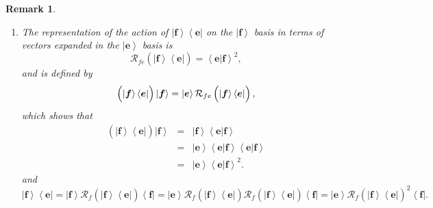 \documentclass[aps,preprint]{revtex4}
\newtheorem{remark}[theorem]{Remark}
\begin{document}
\begin{remark}
\begin{enumerate}
\item The representation of the {\large action} of $\left\vert \boldsymbol{f}%
\right\rangle \left\langle \boldsymbol{e}\right\vert $ on the $\left\vert 
\boldsymbol{f}\right\rangle $ basis in terms of vectors expanded in the $%
\left\vert \boldsymbol{e}\right\rangle $ basis is 
\begin{equation}
\mathcal{R}_{fe}\left( \overset{}{\left\vert \boldsymbol{f}\right\rangle
\left\langle \boldsymbol{e}\right\vert }\right) =\left\langle \left. 
\boldsymbol{e}\right\vert \boldsymbol{f}\right\rangle ^{2},
\end{equation}%
and is defined by 
\begin{equation}
\left( \overset{}{\left\vert \boldsymbol{f}\right\rangle \left\langle 
\boldsymbol{e}\right\vert }\right) \left\vert \boldsymbol{f}\right\rangle
=\left\vert \boldsymbol{e}\right\rangle \mathcal{R}_{fe}\left( \overset{}{%
\left\vert \boldsymbol{f}\right\rangle \left\langle \boldsymbol{e}%
\right\vert }\right) ,
\end{equation}%
which shows that 
\begin{eqnarray}
\left( \overset{}{\left\vert \boldsymbol{f}\right\rangle \left\langle 
\boldsymbol{e}\right\vert }\right) \left\vert \boldsymbol{f}\right\rangle
&=&\left\vert \boldsymbol{f}\right\rangle \left\langle \left. \boldsymbol{e}%
\right\vert \boldsymbol{f}\right\rangle \\
&=&\left\vert \boldsymbol{e}\right\rangle \left\langle \left. \boldsymbol{e}%
\right\vert \boldsymbol{f}\right\rangle \left\langle \left. \boldsymbol{e}%
\right\vert \boldsymbol{f}\right\rangle \\
&=&\left\vert \boldsymbol{e}\right\rangle \left\langle \left. \boldsymbol{e}%
\right\vert \boldsymbol{f}\right\rangle ^{2}.
\end{eqnarray}%
and 
\begin{equation}
\left\vert \boldsymbol{f}\right\rangle \left\langle \boldsymbol{e}%
\right\vert =\left\vert \boldsymbol{f}\right\rangle \mathcal{R}_{f}\left( 
\overset{}{\left\vert \boldsymbol{f}\right\rangle \left\langle \boldsymbol{e}%
\right\vert }\right) \left\langle \boldsymbol{f}\right\vert =\left\vert 
\boldsymbol{e}\right\rangle \mathcal{R}_{f}\left( \overset{}{\left\vert 
\boldsymbol{f}\right\rangle \left\langle \boldsymbol{e}\right\vert }\right) 
\mathcal{R}_{f}\left( \overset{}{\left\vert \boldsymbol{f}\right\rangle
\left\langle \boldsymbol{e}\right\vert }\right) \left\langle \boldsymbol{f}%
\right\vert =\left\vert \boldsymbol{e}\right\rangle \mathcal{R}_{f}\left( 
\overset{}{\left\vert \boldsymbol{f}\right\rangle \left\langle \boldsymbol{e}%
\right\vert }\right) ^{2}\left\langle \boldsymbol{f}\right\vert .
\end{equation}
\end{enumerate}
\end{remark}
\end{document}
